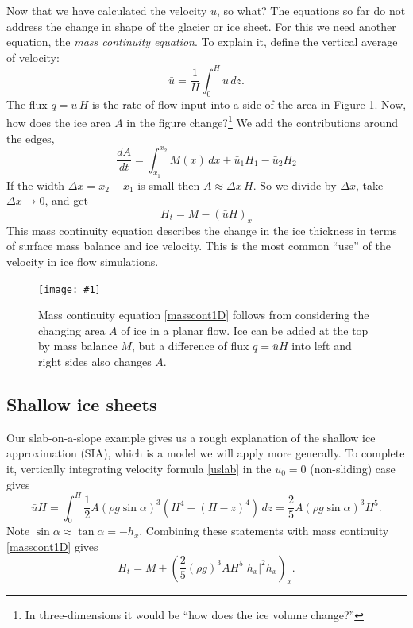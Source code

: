 \documentclass[titlepage,a4paper,final,12pt]{scrartcl}
\newcommand{\onefigsize}[3]{
\begin{figure}[ht]
\centering
\texttt{[image: \#1]}
\caption{#2}
\label{fig:#1}
\end{figure}}
\begin{document}
Now that we have calculated the velocity $u$, so what?  The equations so far do not address the change in shape of the glacier or ice sheet.  For this we need another equation, the \emph{mass continuity equation}.  To explain it, define the vertical average of velocity:
	$$\bar u = \frac{1}{H}\int_0^{H} u\,dz.$$
The flux $q=\bar u\, H$ is the rate of flow input into a side of the area in Figure \ref{fig:slabmasscontfig}.  Now, how does the ice area $A$ in the figure change?\footnote{In three-dimensions it would be ``how does the ice volume change?''}  We add the contributions around the edges,
	$$\frac{dA}{dt} = \int_{x_1}^{x_2} M(x)\,dx + \bar u_1 H_1 - \bar u_2 H_2$$
If the width $\Delta x=x_2-x_1$ is small then $A\approx \Delta x\, H$.  So we divide by $\Delta x$, take $\Delta x \to 0$, and get
\begin{equation}
H_t = M - \left(\bar u H\right)_x \label{masscont1D}
\end{equation}
This mass continuity equation describes the change in the ice thickness in terms of surface mass balance and ice velocity.  This is the most common ``use'' of the velocity in ice flow simulations.

\onefigsize{slabmasscontfig}{Mass continuity equation \eqref{masscont1D} follows from considering the changing area $A$ of ice in a planar flow.  Ice can be added at the top by mass balance $M$, but a difference of flux $q=\bar u H$ into left and right sides also changes $A$.}{2.5in}


\subsection{Shallow ice sheets}

Our slab-on-a-slope example gives us a rough explanation of the shallow ice approximation (SIA), which is a model we will apply more generally.  To complete it, vertically integrating velocity formula \eqref{uslab} in the $u_0=0$ (non-sliding) case gives
\begin{equation}
\bar u H = \int_0^H \frac{1}{2} A (\rho g \sin\alpha)^3  \left(H^4 - (H-z)^4\right)\,dz = \frac{2}{5} A (\rho g \sin\alpha)^3 H^5. \label{siaubar}
\end{equation}
Note $\sin \alpha \approx \tan\alpha = - h_x$.  Combining these statements with mass continuity \eqref{masscont1D} gives
\begin{equation}
  H_t = M + \left(\frac{2}{5} (\rho g)^3 A H^5 |h_x|^2 h_x\right)_x. \label{sia1D}
\end{equation}
\end{document}
